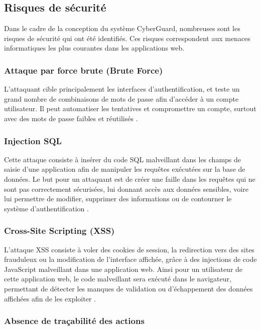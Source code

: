\documentclass[a4paper,12pt]{report}
\begin{document}
    
    \subsection{Risques de sécurité}
    
    Dans le cadre de la conception du système CyberGuard, nombreuses sont les risques de sécurité qui ont été identifiés. Ces risques correspondent aux menaces informatiques les plus courantes dans les applications web.
    
    \subsubsection{Attaque par force brute (Brute Force)}
    
    L'attaquant cible principalement les interfaces d'authentification, et teste un grand nombre de combinaisons de mots de passe afin d'accéder à un compte utilisateur. Il peut automatiser les tentatives et compromettre un compte, surtout avec des mots de passe faibles et réutilisés \cite{owasp}.
    
    \subsubsection{Injection SQL}
    
    Cette attaque consiste à insérer du code SQL malveillant dans les champs de saisie d'une application afin de manipuler les requêtes exécutées sur la base de données. Le but pour un attaquant est de créer une faille dans les requêtes qui ne sont pas correctement sécurisées, lui donnant accès aux données sensibles, voire lui permettre de modifier, supprimer des informations ou de contourner le système d'authentification \cite{owasp}.
    
    \subsubsection{Cross-Site Scripting (XSS)}
    
    L'attaque XSS consiste à voler des cookies de session, la redirection vers des sites frauduleux ou la modification de l'interface affichée, grâce à des injections de code JavaScript malveillant dans une application web. Ainsi pour un utilisateur de cette application web, le code malveillant sera exécuté dans le navigateur, permettant de détecter les manques de validation ou d'échappement des données affichées afin de les exploiter \cite{owasp}.
    
    \subsubsection{Absence de traçabilité des actions}
    
\end{document}

